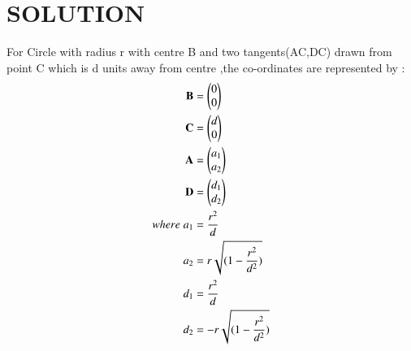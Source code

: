 \documentclass[journal,12pt,twocolumn]{IEEEtran}
\begin{document}
\section*{SOLUTION}
\begin{enumerate}
\begin{lemma}
    For Circle with radius r with centre B and two tangents(AC,DC) drawn from point C which is d units away from centre ,the  co-ordinates are represented by :
    \begin{align}
        \mathbf{B} &= \begin{pmatrix}0\\0\end{pmatrix}\\
        \mathbf{C} &= \begin{pmatrix}d\\0\end{pmatrix}\\
        \mathbf{A} &= \begin{pmatrix}a_1\\a_2\end{pmatrix}\\
        \mathbf{D} &= \begin{pmatrix}d_1\\d_2\end{pmatrix}\\
        where\; a_1 &= \dfrac{r^2}{d}\\
        a_2 &= r\sqrt{(1- \dfrac{r^2}{d^2})}\\
        d_1 &= \dfrac{r^2}{d}\\
        d_2 &= -r\sqrt{(1- \dfrac{r^2}{d^2})}\\
    \end{align}
\end{lemma}
    

\end{enumerate}
\end{document}
